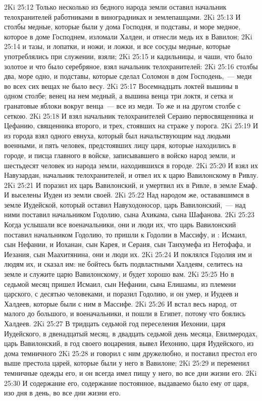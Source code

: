 \vs 2Ki 25:12 Только несколько из бедного народа земли оставил начальник телохранителей работниками в виноградниках и землепашцами.
\vs 2Ki 25:13 И столбы медные, которые были у дома Господня, и подставы, и море медное, которое в доме Господнем, изломали Халдеи, и отнесли медь их в Вавилон;
\vs 2Ki 25:14 и тазы, и лопатки, и ножи, и ложки, и все сосуды медные, которые употреблялись при служении, взяли;
\vs 2Ki 25:15 и кадильницы, и чаши, что было золотое и что было серебряное, взял начальник телохранителей:
\vs 2Ki 25:16 столбы  два, море одно, и подставы, которые сделал Соломон в дом Господень,~--- меди во всех сих вещах не было весу.
\vs 2Ki 25:17 Восемнадцать локтей вышины в одном столбе; венец на нем медный, а вышина венца три локтя, и сетка и гранатовые яблоки вокруг венца~--- все из меди. То же и на другом столбе с сеткою.
\vs 2Ki 25:18 И взял начальник телохранителей Сераию первосвященника и Цефанию, священника второго, и трех, стоявших на страже у порога.
\vs 2Ki 25:19 И из города взял одного евнуха, который был начальствующим над людьми военными, и пять человек, предстоявших лицу царя, которые находились в городе, и писца главного в войске, записывавшего в войско народ земли, и шестьдесят человек из народа земли, находившихся в городе.
\vs 2Ki 25:20 И взял их Навузардан, начальник телохранителей, и отвел их к царю Вавилонскому в Ривлу.
\vs 2Ki 25:21 И поразил их царь Вавилонский, и умертвил их в Ривле, в земле Емаф. И выселены Иудеи из земли своей.
\vs 2Ki 25:22 Над народом же, остававшимся в земле Иудейской, который оставил Навуходоносор, царь Вавилонский,~--- над ними поставил начальником Годолию, сына Ахикама, сына Шафанова.
\vs 2Ki 25:23 Когда услышали все военачальники, они и люди их, что царь Вавилонский поставил начальником Годолию, то пришли к Годолии в Массифу, и : Исмаил, сын Нефании, и Иоханан, сын Карея, и Сераия, сын Танхумефа из Нетофафа, и Иезания, сын Маахитянина, они и люди их.
\vs 2Ki 25:24 И поклялся Годолия им и людям их, и сказал им: не бойтесь быть подвластными Халдеям, селитесь на земле и служите царю Вавилонскому, и будет хорошо вам.
\vs 2Ki 25:25 Но в седьмой месяц пришел Исмаил, сын Нефании, сына Елишамы, из племени царского, с десятью человеками, и поразил Годолию, и он умер, и Иудеев и Халдеев, которые были с ним в Массифе.
\vs 2Ki 25:26 И встал весь народ, от малого до большого, и военачальники, и пошли в Египет, потому что боялись Халдеев.
\rsbpar\vs 2Ki 25:27 В тридцать седьмой год переселения Иехонии, царя Иудейского, в двенадцатый месяц, в двадцать седьмой день месяца, Евилмеродах, царь Вавилонский, в год своего воцарения, вывел Иехонию, царя Иудейского, из дома темничного
\vs 2Ki 25:28 и говорил с ним дружелюбно, и поставил престол его выше престола царей, которые были у него в Вавилоне;
\vs 2Ki 25:29 и переменил темничные одежды его, и он всегда имел пищу у него, во все дни жизни его.
\vs 2Ki 25:30 И содержание его, содержание постоянное, выдаваемо было ему от царя, изо дня в день, во все дни жизни его.
